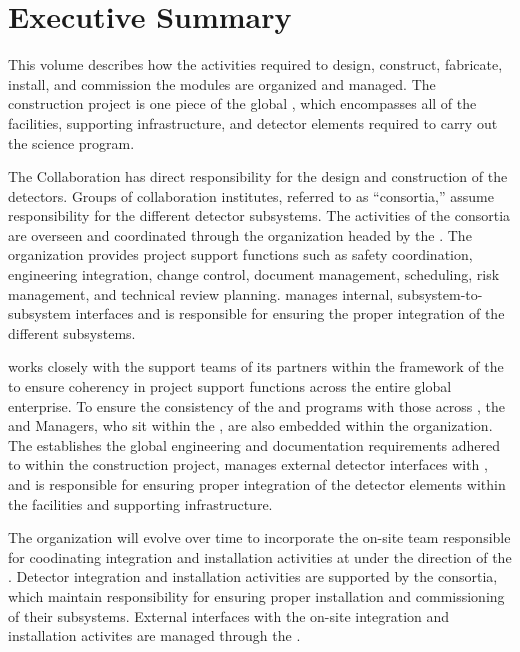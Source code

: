 \chapter{Executive Summary}

\label{vl:tc-execsum}




This volume describes how the activities required to design, construct,
fabricate, install, and commission the   modules 
are organized and managed.  The   construction 
project is one piece of the global , which encompasses 
all of the facilities, supporting infrastructure, and detector elements
required to carry out the  science program.    
      
The  Collaboration has direct responsibility for the design 
and construction of the  detectors.  Groups of collaboration 
institutes, referred to as ``consortia,'' assume responsibility for 
the different detector subsystems.  The activities of the consortia are 
overseen and coordinated through the   organization 
headed by the  .  The  organization 
provides project support functions such as safety coordination, 
engineering integration, change control, document management, scheduling, 
risk management, and technical review planning.    
manages internal, subsystem-to-subsystem interfaces and is responsible 
for ensuring the proper integration of the different subsystems.   

  works closely with the support teams of its 
 partners within the framework of the  to 
ensure coherency in project support functions across the entire global 
enterprise.  To ensure the consistency of the   
and  programs with those across , the 
  and  Managers, who sit within 
the , are also embedded within the   
organization.  The  establishes the global engineering
and documentation requirements adhered to within the  
 construction project, manages external  detector 
interfaces with , and is responsible for ensuring proper 
integration of the  detector elements within the facilities 
and supporting infrastructure.  

The  organization will evolve over time to incorporate the 
on-site team responsible for coodinating integration and installation 
activities at  under the direction of the .  
Detector integration and installation activities are supported by the 
 consortia, which maintain responsibility for ensuring 
proper installation and commissioning of their subsystems.  External 
 interfaces with the on-site integration and installation 
activites are managed through the .

